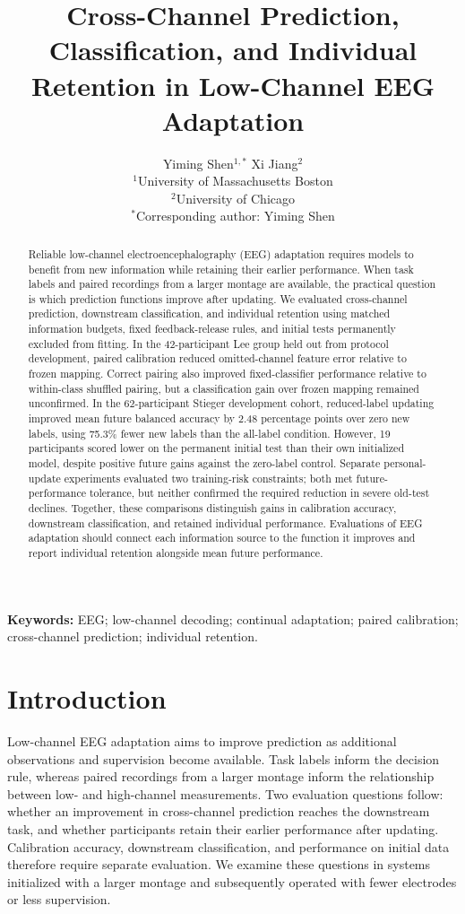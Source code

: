 \documentclass[11pt,a4paper]{article}
\title{Cross-Channel Prediction, Classification, and Individual Retention in Low-Channel EEG Adaptation}
\author{Yiming Shen$^{1,*}$ \quad Xi Jiang$^{2}$\\[0.6em]
\small $^{1}$University of Massachusetts Boston\\
\small $^{2}$University of Chicago\\
\small $^{*}$Corresponding author: Yiming Shen}
\date{}
\begin{document}
\maketitle

\begin{abstract}
Reliable low-channel electroencephalography (EEG) adaptation requires models to benefit from new information while retaining their earlier performance. When task labels and paired recordings from a larger montage are available, the practical question is which prediction functions improve after updating. We evaluated cross-channel prediction, downstream classification, and individual retention using matched information budgets, fixed feedback-release rules, and initial tests permanently excluded from fitting. In the 42-participant Lee group held out from protocol development, paired calibration reduced omitted-channel feature error relative to frozen mapping. Correct pairing also improved fixed-classifier performance relative to within-class shuffled pairing, but a classification gain over frozen mapping remained unconfirmed. In the 62-participant Stieger development cohort, reduced-label updating improved mean future balanced accuracy by 2.48 percentage points over zero new labels, using 75.3\% fewer new labels than the all-label condition. However, 19 participants scored lower on the permanent initial test than their own initialized model, despite positive future gains against the zero-label control. Separate personal-update experiments evaluated two training-risk constraints; both met future-performance tolerance, but neither confirmed the required reduction in severe old-test declines. Together, these comparisons distinguish gains in calibration accuracy, downstream classification, and retained individual performance. Evaluations of EEG adaptation should connect each information source to the function it improves and report individual retention alongside mean future performance.
\end{abstract}

\noindent\textbf{Keywords:} EEG; low-channel decoding; continual adaptation; paired calibration; cross-channel prediction; individual retention.

\section{Introduction}

Low-channel EEG adaptation aims to improve prediction as additional observations and supervision become available. Task labels inform the decision rule, whereas paired recordings from a larger montage inform the relationship between low- and high-channel measurements. Two evaluation questions follow: whether an improvement in cross-channel prediction reaches the downstream task, and whether participants retain their earlier performance after updating. Calibration accuracy, downstream classification, and performance on initial data therefore require separate evaluation. We examine these questions in systems initialized with a larger montage and subsequently operated with fewer electrodes or less supervision.
\end{document}
